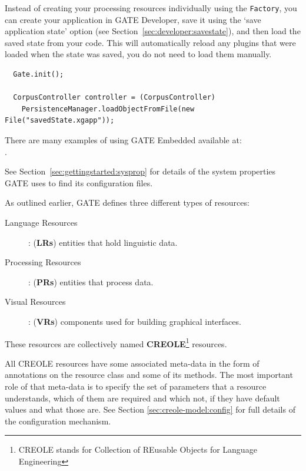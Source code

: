 %
Instead of creating your processing resources individually using the
\texttt{Factory}, you can create your application in GATE Developer, save it using the
`save application state' option (see
Section~\ref{sec:developer:savestate}), and then load the saved state from
your code.  This will automatically reload any plugins that were
loaded when the state was saved, you do not need to load them
manually.
\begin{lstlisting}
  Gate.init();

  CorpusController controller = (CorpusController)
    PersistenceManager.loadObjectFromFile(new File("savedState.xgapp"));
\end{lstlisting}
There are many examples of using GATE Embedded available at:\\
.


See Section~\ref{sec:gettingstarted:sysprop} for details of the system
properties GATE uses to find its configuration files.

As outlined earlier, GATE defines three different types of resources:
\begin{description}
\item[Language Resources]{: (\textbf{LRs}) entities that hold linguistic data.
}

\item[Processing Resources]{: (\textbf{PRs}) entities that process data.
}

\item[Visual Resources]{: (\textbf{VRs}) components used for building
graphical interfaces. }

\end{description}

These resources are collectively named \textbf{CREOLE}\footnote{CREOLE
stands for Collection of REusable Objects for Language Engineering} resources.

All CREOLE resources have some associated meta-data in the form of annotations
on the resource class and some of its methods.  The most important role of that
meta-data is to specify the set of parameters that a resource understands, which
of them are required and which not, if they have default values and what those
are. See Section \ref{sec:creole-model:config} for full details of the
configuration mechanism.


